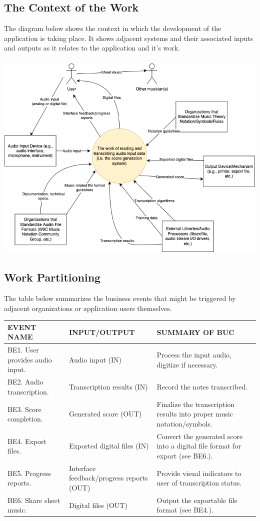 \documentclass[12pt]{article}
\begin{document}
\subsection{The Context of the Work}
The diagram below shows the context in which the development of the application is taking place. It shows
adjacent systems and their associated inputs and outputs as it relates to the application and it's work. \\\\
\includegraphics[width=\textwidth]{SRS-contex-diagram-revised.png}

\subsection{Work Partitioning}
The table below summarizes the business events that might be triggered by adjacent organizations
or application users themselves.\\
\begingroup
\renewcommand{\arraystretch}{1.25}
\begin{tabular}{|>{\raggedright}p{3cm}|>{\raggedright}p{4.25cm}|>{\raggedright\arraybackslash}p{6cm}|}
  \hline
  EVENT NAME & INPUT/OUTPUT & SUMMARY OF BUC \\
  \hline
  BE1. User provides audio input. & Audio input (IN) & Process the input audio, digitize if necessary.\\
  \hline
  BE2. Audio transcription. & Transcription results (IN) & Record the notes transcribed. \\
  \hline
  BE3. Score completion. & Generated score (OUT) & Finalize the transcription results into proper music notation/symbols.\\
  \hline
  BE4. Export files. & Exported digital files (IN)  & Convert the generated score into a digital file format for export (see BE6.).\\
  \hline
  BE5. Progress reports. & Interface feedback/progress reports (OUT) & Provide visual indicators to user of transcription status.\\
  \hline
  BE6. Share sheet music. & Digital files (OUT)  & Output the exportable file format (see BE4.).\\
  \hline
\end{tabular}
\endgroup
\end{document}
